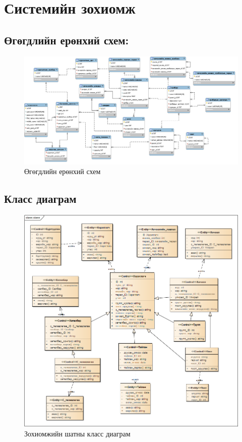 
\chapter{Системийн зохиомж} %
\label{Chapter3} %
\newpage
\section{Өгөгдлийн ерөнхий схем:}
		\begin{figure}[h!]
			\includegraphics[angle=90, scale=0.4]{Diagrams/eschool_course}
			\caption[Өгөгдлийн ерөнхий схем]{Өгөгдлийн ерөнхий схем}
			\label{text}
		\end{figure}
\newpage	
\section{Класс диаграм}
	\begin{figure}[!h]
		\includegraphics[angle=90,scale=0.5]{Diagrams/Class}
		\caption[Зохиомжийн шатны класс диаграм]{Зохиомжийн шатны класс диаграм}
		\label{text}
	\end{figure}
	
